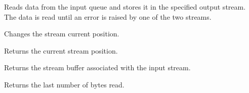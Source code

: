 Reads data from the input queue and stores it in the specified output stream.
The data is read until an error is raised by one of the two streams.



Changes the stream current position.



Returns the current stream position.



Returns the stream buffer associated with the input stream.



Returns the last number of bytes read.

